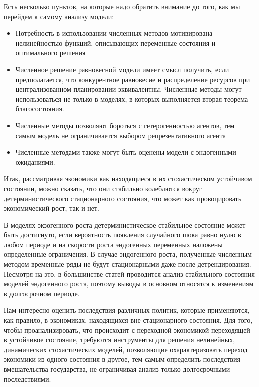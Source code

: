 \documentclass[12pt,a4paper, oneside]{extreport}
\begin{document}
Есть несколько пунктов, на которые  надо обратить внимание  до того, как  мы перейдем к самому анализу модели:

\begin{itemize}
	\item Потребность в использовании численных методов  мотивирована  нелинейностью  функций, описывающих  переменные состояния и оптимального  решения 
	\item  Численное решение   равновесной модели имеет смысл получить, если предполагается, что  конкурентное  равновесие  и распределение  ресурсов при  централизованном планировании  эквивалентны. Численные методы могут использоваться  не только в  моделях, в которых  выполняется вторая теорема  благосостояния.
	\item  Численные  методы  позволяют  бороться  с гетерогенностью агентов, тем самым модель  не ограничивается выбором репрезентативного агента 
	\item   Численные методами  также   могут быть   оценены  модели с эндогенными  ожиданиями.
	
\end{itemize}








Итак, рассматривая экономики  как находящиеся  в их стохастическом устойчивом состоянии, можно сказать, что они  стабильно  колеблются  вокруг детерминистического стационарного состояния, что  может как провоцировать экономический рост, так и нет. 

В моделях экзогенного роста детерминистическое стабильное состояние   может быть достигнуто,  если вероятность появления случайного шока равно  нулю  в любом  периоде  и на скорости роста эндогенных переменных  наложены  определенные ограничения. 
В случае  эндогенного роста,  полученные численным методом  временные ряды не будут стационарными даже после детрендирования. 
Несмотря на это, в большинстве статей проводится  анализ стабильного состояния  моделей эндогенного роста, поэтому выводы в основном относятся к  изменениям в долгосрочном периоде.


Нам интересно оценить последствия  различных политик, которые применяются, как правило, в  экономиках, находящихся  вне стационарного состояния.  Для того, чтобы проанализировать, что происходит с переходной экономикой переходящей  в  устойчивое состояние,  требуются  инструменты для решения нелинейных, динамических стохастических моделей, позволяющие охарактеризовать  переход экономики из одного состояния в другое, тем самым определить  последствия  вмешательства государства,  не ограничивая анализ только долгосрочными последствиями. 
\end{document}

